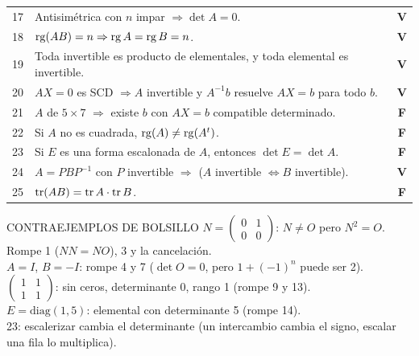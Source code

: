 {\begin{tabularx}{\linewidth}{@{}r X c@{}}
17 & Antisimétrica con $n$ impar $\Rightarrow\det A=0$. & \textcolor{verde}{\textbf{V}}\\
18 & $\operatorname{rg}(AB)=n\Rightarrow\operatorname{rg} A=\operatorname{rg} B=n$. & \textcolor{verde}{\textbf{V}}\\
19 & Toda invertible es producto de elementales, y toda elemental es invertible. & \textcolor{verde}{\textbf{V}}\\
20 & $AX=0$ es SCD $\Rightarrow A$ invertible y $A^{-1}b$ resuelve $AX=b$ para todo $b$. & \textcolor{verde}{\textbf{V}}\\
21 & $A$ de $5\times7$ $\Rightarrow$ existe $b$ con $AX=b$ compatible determinado. & \textcolor{rojo}{\textbf{F}}\\
22 & Si $A$ no es cuadrada, $\operatorname{rg}(A)\neq\operatorname{rg}(A^t)$. & \textcolor{rojo}{\textbf{F}}\\
23 & Si $E$ es una forma escalonada de $A$, entonces $\det E=\det A$. & \textcolor{rojo}{\textbf{F}}\\
24 & $A=PBP^{-1}$ con $P$ invertible $\Rightarrow$ ($A$ invertible $\iff B$ invertible). & \textcolor{verde}{\textbf{V}}\\
25 & $\operatorname{tr}(AB)=\operatorname{tr} A\cdot\operatorname{tr} B$. & \textcolor{rojo}{\textbf{F}}\\
\bottomrule
\end{tabularx}}

\begin{memo}{CONTRAEJEMPLOS DE BOLSILLO}
$N=\begin{pmatrix}0&1\\0&0\end{pmatrix}$: $N\neq O$ pero $N^2=O$. Rompe 1 ($NN=NO$), 3 y la cancelación.\\
$A=I$, $B=-I$: rompe 4 y 7 ($\det O=0$, pero $1+(-1)^n$ puede ser 2).\\
$\begin{pmatrix}1&1\\1&1\end{pmatrix}$: sin ceros, determinante 0, rango 1 (rompe 9 y 13).\\
$E=\mathrm{diag}(1,5)$: elemental con determinante 5 (rompe 14).\\
23: escalerizar cambia el determinante (un intercambio cambia el signo, escalar una fila lo multiplica).
\end{memo}

